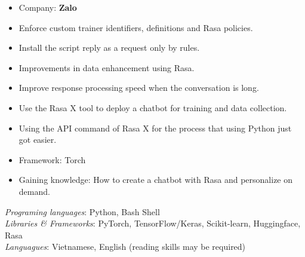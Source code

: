 \documentclass[letter]{cv-template}
\begin{document}
       
        {}{
            \begin{itemize}
                \item Company: \textbf{Zalo}
                \item Enforce custom trainer identifiers, definitions and Rasa policies.
                \item Install the script reply as a request only by rules.
                \item Improvements in data enhancement using Rasa.
                \item Improve response processing speed when the conversation is long.
                \item Use the Rasa X tool to deploy a chatbot for training and data collection.
                \item Using the API command of Rasa X for the process that using Python just got easier. 
                \item Framework: Torch
                \item Gaining knowledge: How to create a chatbot with Rasa and personalize on demand.
            \end{itemize} \leavevmode
        }
    

        \textit{Programing languages}: Python, Bash Shell \\
        \textit{Libraries \& Frameworks}: PyTorch, TensorFlow/Keras, Scikit-learn, Huggingface, Rasa \\
        \textit{Languagues}: Vietnamese, English (reading skills may be required)
\end{document}
